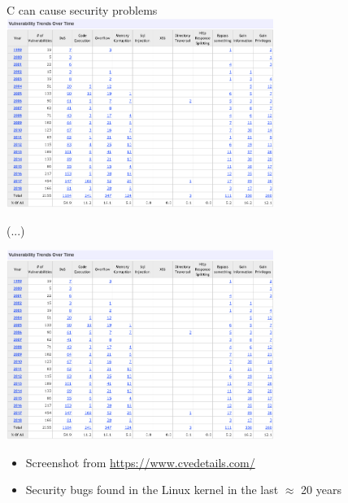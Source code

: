 \documentclass[NET,english,aspectratio=169,notitleframe]{tumbeamer}
\begin{document}
\begin{frame}{C can cause security problems}
\centering\includegraphics[trim={0 13cm 0 0},clip,width=0.65\textwidth]{pics/cve}

\footnotesize (...)

\centering\includegraphics[trim={0 0 0 17.5cm},clip,width=0.65\textwidth]{pics/cve}

\begin{itemize}
\item Screenshot from \url{https://www.cvedetails.com/}
\item Security bugs found in the Linux kernel in the last $\approx$ 20 years
\end{itemize}

\end{frame}
\end{document}
